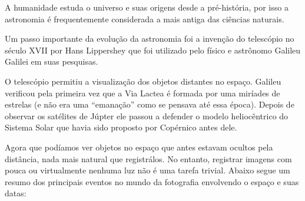 \documentclass[
	article,			%
	12pt,				%
	oneside,			%
	a4paper,			%
	english,			%
	brazil,				%
	sumario=tradicional
	]{abntex2}
\begin{document}
A humanidade estuda o universo e suas origens desde a pré-história, por isso a 
astronomia é frequentemente considerada a mais antiga das ciências naturais.
~\cite{astronomiaantiga}

Um passo importante da evolução da astronomia foi a invenção do telescópio no 
século XVII por Hans Lippershey que foi utilizado pelo físico e astrônomo
Galileu Galilei em suas pesquisas.~\cite{ronan1987historia}

O telescópio permitiu a visualização dos objetos distantes no espaço. Galileu 
verificou pela primeira vez que a Via Lactea é formada por uma miríades de 
estrelas (e não era uma ``emanação'' como se pensava até essa época). Depois de
observar os satélites de Júpter ele passou a defender o modelo heliocêntrico do
Sistema Solar que havia sido proposto por Copérnico antes dele.

Agora que podíamos ver objetos no espaço que antes estavam ocultos pela
distância, nada mais natural que registrálos. No entanto, registrar imagens com
pouca ou virtualmente nenhuma luz não é uma tarefa trivial. Abaixo segue um
resumo dos principais eventos no mundo da fotografia envolvendo o espaço e suas
datas:
\end{document}
